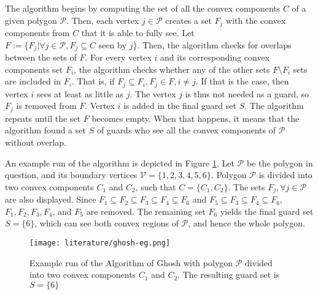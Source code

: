 The algorithm begins by computing the set of all the convex components $C$ of a given polygon $\mathcal P$. Then, each vertex $j \in \mathcal P$ creates a set $F_j$ with the convex components from $C$ that it is able to fully see. Let $F := \{F_j | \forall j \in \mathcal P, F_j \subseteq C \text{ seen by } j\}$. Then, the algorithm checks for overlaps between the sets of $F$. For every vertex $i$ and its corresponding convex components set $F_i$, the algorithm checks whether any of the other sets $F \setminus F_i$ sets are included in $F_i$. That is, if $F_j \subseteq F_i, F_j \in F, i \neq j$. If that is the case, then  vertex $i$ sees at least as little as $j$. The vertex $j$ is thus not needed as a guard, so $F_j$ is removed from $F$. Vertex $i$ is added in the final guard set $S$. The algorithm repeats until the set $F$ becomes empty. When that happens, it means that the algorithm found a set $S$ of guards who see all the convex components of $\mathcal P$ without overlap.


An example run of the algorithm is depicted in Figure \ref{fig:ghosh}. Let $\mathcal P$ be the polygon in question, and its boundary vertices $\mathcal V = \{1, 2, 3, 4, 5, 6\}$. Polygon $\mathcal P$ is divided into two convex components $C_1$ and $C_2$, such that $C = \{C_1, C_2\}$. The sets $F_j, \forall j \in \mathcal P$ are also displayed. Since $F_1 \subseteq F_2 \subseteq F_3 \subseteq F_4 \subseteq F_6$ and $F_5 \subseteq F_3 \subseteq F_4 \subseteq F_6$, $F_1, F_2, F_3, F_4$, and $F_5$ are removed. The remaining set $F_6$ yields the final guard set $S = \{6\}$, which can see both convex regions of $\mathcal P$, and hence the whole polygon.

\begin{figure}[h!]
    \centering
    \texttt{[image: literature/ghosh-eg.png]}
    \caption{Example run of the Algorithm of Ghosh \cite{GHOSH2010718} with polygon $\mathcal P$ divided into two convex components $C_1$ and $C_2$. The resulting guard set is $S = \{6\}$}
    \label{fig:ghosh}
\end{figure}

\newpage
